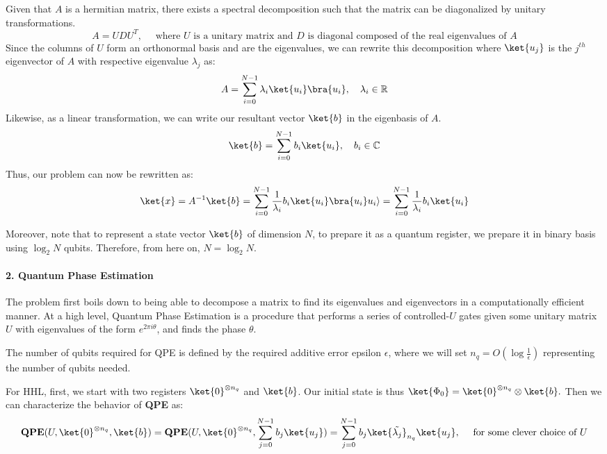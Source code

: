 \documentclass[11pt]{article}
\begin{document}
Given that \(A\) is a hermitian matrix, there exists a spectral
decomposition such that the matrix can be diagonalized by unitary
transformations.
\[A = UDU^T,\quad \text{ where } U \text{ is a unitary matrix and } D \text{ is diagonal composed of the real eigenvalues of } A\]
Since the columns of \(U\) form an orthonormal basis and are the
eigenvalues, we can rewrite this decomposition where \(\ket{u_{j}}\) is
the \(j^{th}\) eigenvector of \(A\) with respective eigenvalue
\(\lambda_{j}\) as:
\[A = \sum_{i=0}^{N-1}\lambda_{i}\ket{u_{i}}\bra{u_{i}}, \quad \lambda_{i}\in\mathbb{ R }\]
Likewise, as a linear transformation, we can write our resultant vector
\(\ket{b}\) in the eigenbasis of \(A\).
\[\ket{b} = \sum_{i=0}^{N-1}b_{i}\ket{u_{i}}, \quad b_{i}\in\mathbb{ C }\]
Thus, our problem can now be rewritten as:
\[\ket{x} = A^{-1}\ket{b} = \sum_{i=0}^{N-1}\frac{1}{\lambda_{i}}b_{i}\ket{u_{i}}\bra{u_{i}}u_{i}\rangle = \sum_{i=0}^{N-1}\frac{1}{\lambda_{i}}b_{i}\ket{u_{i}}\]

Moreover, note that to represent a state vector \(\ket{b}\) of dimension
\(N\), to prepare it as a quantum register, we prepare it in binary
basis using \(\log_2{N}\) qubits. Therefore, from here on,
\(N = \log_2{N}\).

\paragraph{\texorpdfstring{\textbf{2. Quantum Phase
Estimation}}{2. Quantum Phase Estimation}}\label{quantum-phase-estimation}

The problem first boils down to being able to decompose a matrix to find
its eigenvalues and eigenvectors in a computationally efficient manner.
At a high level, Quantum Phase Estimation is a procedure that performs a
series of controlled-\(U\) gates given some unitary matrix \(U\) with
eigenvalues of the form \(e^{2\pi i \theta}\), and finds the phase
\(\theta\).

The number of qubits required for QPE is defined by the required
additive error epsilon \(\epsilon\), where we will set
\(n_q = O(\log{\frac{1}{\epsilon}})\) representing the number of qubits
needed.

For HHL, first, we start with two registers \(\ket{0}^{\otimes n_q}\)
and \(\ket{b}\). Our initial state is thus
\(\ket{\Phi_0} = \ket{0}^{\otimes n_q} \otimes \ket{b}.\) Then we can
characterize the behavior of \textbf{QPE} as:
\[\textbf{QPE}(U,\ket{0}^{\otimes n_q},\ket{b}) = \textbf{QPE}(U,\ket{0}^{\otimes n_q},\sum_{j=0}^{N-1}b_{j}\ket{u_{j}}) = \sum_{j=0}^{N-1}b_{j} \ket{\tilde{\lambda_{j}}}_{n_q}  \ket{u_{j}}, \quad\text{ for some clever choice of } U\]
\end{document}
